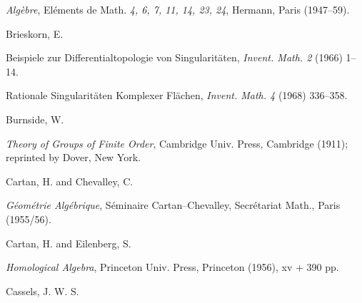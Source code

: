 {\noindent\hangindent=25bp\hspace*{6bp}%
\emph{Alg\`ebre}, El\'ements de Math. \emph{4, 6, 7, 11, 14, 23, 24}, Hermann, Paris (1947--59).\par
\par\vspace{2.15pt}\noindent \hypertarget{bib-474-6}{}Brieskorn, E.\par
\noindent\hangindent=25bp\hspace*{6bp}%
Beispiele zur Differentialtopologie von Singularit\"aten, \emph{Invent. Math. 2} (1966) 1--14.\par
\noindent\hangindent=25bp\hspace*{6bp}%
Rationale Singularit\"aten Komplexer Fl\"achen, \emph{Invent. Math. 4} (1968) 336--358.\par
\par\vspace{2.15pt}\noindent \hypertarget{bib-474-8}{}Burnside, W.\par
\noindent\hangindent=25bp\hspace*{6bp}%
\emph{Theory of Groups of Finite Order}, Cambridge Univ. Press, Cambridge (1911); reprinted by Dover, New York.\par
\par\vspace{2.15pt}\noindent \hypertarget{bib-474-9}{}Cartan, H. and Chevalley, C.\par
\noindent\hangindent=25bp\hspace*{6bp}%
\emph{G\'eom\'etrie Alg\'ebrique}, S\'eminaire Cartan--Chevalley, Secr\'etariat Math., Paris (1955/56).\par
\par\vspace{2.15pt}\noindent \hypertarget{bib-474-10}{}Cartan, H. and Eilenberg, S.\par
\noindent\hangindent=25bp\hspace*{6bp}%
\emph{Homological Algebra}, Princeton Univ. Press, Princeton (1956), xv + 390 pp.\par
\par\vspace{2.15pt}\noindent \hypertarget{bib-474-11}{}Cassels, J. W. S.\par
}
